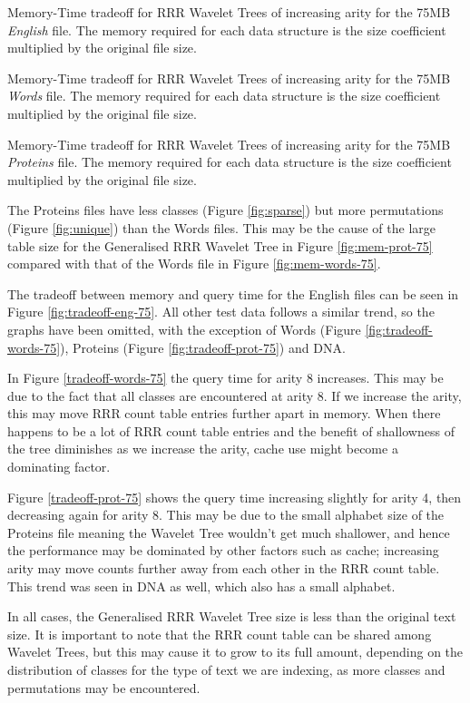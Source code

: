 			{Memory-Time tradeoff for RRR Wavelet Trees of increasing arity for
			the 75MB \emph{English} file. The memory required for each data 
			structure is the size coefficient 
			multiplied by the original file size.}
		
			{Memory-Time tradeoff for RRR Wavelet Trees of increasing arity for
			the 75MB \emph{Words} file. The memory required for each data 
			structure is the size coefficient 
			multiplied by the original file size.}
		
			{Memory-Time tradeoff for RRR Wavelet Trees of increasing arity for
			the 75MB \emph{Proteins} file. The memory required for each data 
			structure is the size coefficient 
			multiplied by the original file size.}
		
The Proteins files have less classes (Figure \ref{fig:sparse}) but more 
permutations (Figure \ref{fig:unique}) than the Words files. This may be the 
cause of the large table size for the Generalised RRR Wavelet Tree in Figure
\ref{fig:mem-prot-75} compared with that of the Words file in Figure 
\ref{fig:mem-words-75}.

The tradeoff between memory and query time for the English files can be seen in 
Figure \ref{fig:tradeoff-eng-75}. All other test data follows a similar trend, 
so the graphs have been omitted, with the exception of Words (Figure 
\ref{fig:tradeoff-words-75}), Proteins (Figure \ref{fig:tradeoff-prot-75}) and
DNA.

In Figure \ref{tradeoff-words-75} the query time for arity 8 increases. This 
may be due to the fact that all classes are encountered at arity 8. If we 
increase the arity, this may move RRR count table entries further apart in 
memory. When there happens to be a lot of RRR count table entries and the 
benefit of shallowness of the tree diminishes as we increase the arity, cache 
use might become a dominating factor.

Figure \ref{tradeoff-prot-75} shows the query time increasing slightly for arity 
4, then decreasing again for arity 8. This may be due to the small alphabet size
of the Proteins file meaning the Wavelet Tree wouldn't get much shallower, and
hence the performance may be dominated by other factors such as cache; 
increasing arity may move counts further away from each other in the RRR count 
table. This trend was seen in DNA as well, which also has a small alphabet.

In all cases, the Generalised RRR Wavelet Tree size is less than the original
text size. It is important to note that the RRR count table can be shared among
Wavelet Trees, but this may cause it to grow to its full amount, depending on
the distribution of classes for the type of text we are indexing, as more 
classes and permutations may be encountered.
